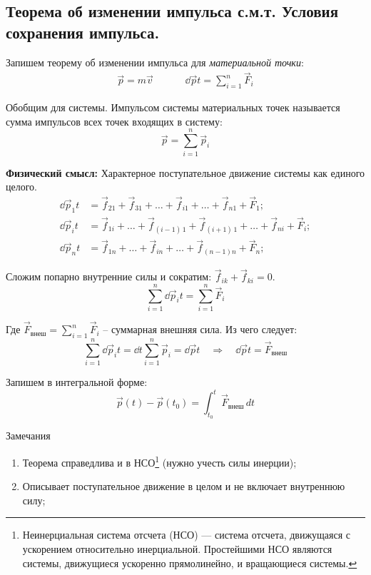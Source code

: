 \subsection{\textbf{Теорема об изменении импульса с.м.т.} Условия сохранения импульса.}

Запишем теорему об изменении импульса для \textit{материальной точки}:
\[\begin{aligned}
	\vec{p} = m\vec{v} &&&& \dd{\vec{p}}{t} = \sum_{i=1}^{n} \vec{F}_i
\end{aligned}\]

Обобщим для системы. Импульсом системы материальных точек называется сумма импульсов всех точек входящих в систему:
\[\vec{p} = \sum_{i=1}^{n} \vec{p}_i\]

\textbf{Физический смысл:} Характерное поступательное движение системы как единого целого.
\begin{align*}
	\dd{\vec{p}_1}{t} &= \vec{f}_{21} + \vec{f}_{31} + \dots + \vec{f}_{i1} + \dots + \vec{f}_{n1} + \vec{F}_1; \\
	\dd{\vec{p}_i}{t} &= \vec{f}_{1i} + \dots + \vec{f}_{(i-1) \, 1} +\vec{f}_{(i+1) \, 1} + \dots + \vec{f}_{ni} + \vec{F}_i; \\
	\dd{\vec{p}_n}{t} &= \vec{f}_{1n} + \dots + \vec{f}_{in} + \dots + \vec{f}_{(n-1)n} + \vec{F}_n;
\end{align*}

Сложим попарно внутренние силы и сократим: \(\vec{f}_{ik} + \vec{f}_{ki} = 0\).
\[\sum_{i=1}^{n} \dd{\vec{p}_i}{t} = \sum_{i=1}^{n} \vec{F}_i\]

Где $\vec{F}_{\text{внеш}} = \sum_{i=1}^{n} \vec{F}_i$ -- суммарная внешняя сила. Из чего следует:
\[\sum_{i=1}^{n} \dd{\vec{p}_i}{t} = \dd{}{t} \sum_{i=1}^{n} \vec{p}_i = \dd{\vec{p}}{t} \quad\Rightarrow\quad \boxed{\dd{\vec{p}}{t} = \vec{F}_\text{внеш}}\]

Запишем в интегральной форме:
\[\boxed{\vec{p}(t) - \vec{p}(t_0) = \int_{t_0}^{t} \vec{F}_{\text{внеш}} \, dt}\]

\begin{tbox}{Замечания}
	\begin{enumerate}
		\item Теорема справедлива и в НСО\footnote{Неинерциальная система отсчета (НСО) — система отсчета, движущаяся с ускорением относительно инерциальной. Простейшими НСО являются системы, движущиеся ускоренно прямолинейно, и вращающиеся системы.} (нужно учесть силы инерции);
		\item Описывает поступательное движение в целом и не включает внутреннюю силу;
	\end{enumerate}
\end{tbox}